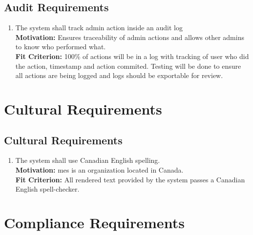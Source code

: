 \documentclass[12pt]{article}
\begin{document}
\subsection{Audit Requirements}
\begin{enumerate}[align=left,
  leftmargin=*,
  labelsep=1em,
  itemindent=0em,
  label=\bfseries AU-\arabic*:,
  ref=\bfseries AU-\arabic*]
  \item \label{SAuR1} The system shall track admin action inside an audit log\\[2mm]
    {\bf Motivation:} Ensures traceability of admin actions and allows other admins to know who performed what.  \\
    {\bf Fit Criterion:} 100\% of actions will be in a log with tracking of user who did the action, timestamp and action commited. Testing will be done to ensure all actions are being logged and logs should be exportable for review.
\end{enumerate}

\section{Cultural Requirements}
\subsection{Cultural Requirements}
\begin{enumerate}[align=left,
  leftmargin=*,
  labelsep=1em,
  itemindent=0em,
  label=\bfseries CL-\arabic*:,
  ref=\bfseries CL-\arabic*]
  \item \label{CTR1} The system shall use Canadian English spelling.\\[2mm]
    {\bf Motivation:} \Gls{mes} is an organization located in Canada.\\
    {\bf Fit Criterion:} All rendered text provided by the system passes a Canadian English spell-checker.\\
\end{enumerate}

\section{Compliance Requirements}
\end{document}
